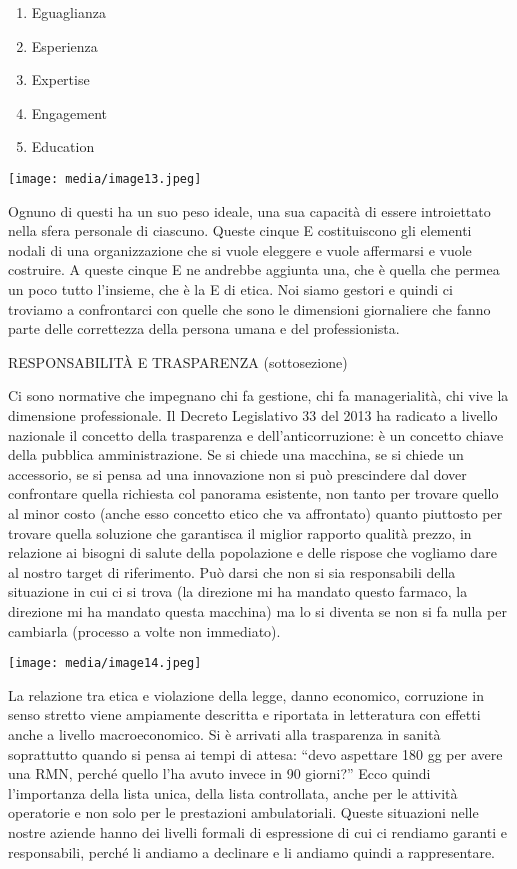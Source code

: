 \documentclass[]{article}
\begin{document}
\begin{enumerate}
\def\labelenumi{\arabic{enumi}.}
\item
  Eguaglianza
\item
  Esperienza
\item
  Expertise
\item
  Engagement
\item
  Education
\end{enumerate}

\texttt{[image: media/image13.jpeg]}

Ognuno di questi ha un suo peso ideale, una sua capacità di essere
introiettato nella sfera personale di ciascuno. Queste cinque E
costituiscono gli elementi nodali di una organizzazione che si vuole
eleggere e vuole affermarsi e vuole costruire. A queste cinque E ne
andrebbe aggiunta una, che è quella che permea un poco tutto l'insieme,
che è la E di etica. Noi siamo gestori e quindi ci troviamo a
confrontarci con quelle che sono le dimensioni giornaliere che fanno
parte delle correttezza della persona umana e del professionista.

RESPONSABILITÀ E TRASPARENZA (sottosezione)

Ci sono normative che impegnano chi fa gestione, chi fa managerialità,
chi vive la dimensione professionale. Il Decreto Legislativo 33 del 2013
ha radicato a livello nazionale il concetto della trasparenza e
dell'anticorruzione: è un concetto chiave della pubblica
amministrazione. Se si chiede una macchina, se si chiede un accessorio,
se si pensa ad una innovazione non si può prescindere dal dover
confrontare quella richiesta col panorama esistente, non tanto per
trovare quello al minor costo (anche esso concetto etico che va
affrontato) quanto piuttosto per trovare quella soluzione che garantisca
il miglior rapporto qualità prezzo, in relazione ai bisogni di salute
della popolazione e delle rispose che vogliamo dare al nostro target di
riferimento. Può darsi che non si sia responsabili della situazione in
cui ci si trova (la direzione mi ha mandato questo farmaco, la direzione
mi ha mandato questa macchina) ma lo si diventa se non si fa nulla per
cambiarla (processo a volte non immediato).

\texttt{[image: media/image14.jpeg]}

La relazione tra etica e violazione della legge, danno economico,
corruzione in senso stretto viene ampiamente descritta e riportata in
letteratura con effetti anche a livello macroeconomico. Si è arrivati
alla trasparenza in sanità soprattutto quando si pensa ai tempi di
attesa: ``devo aspettare 180 gg per avere una RMN, perché quello l'ha
avuto invece in 90 giorni?'' Ecco quindi l'importanza della lista unica,
della lista controllata, anche per le attività operatorie e non solo per
le prestazioni ambulatoriali. Queste situazioni nelle nostre aziende
hanno dei livelli formali di espressione di cui ci rendiamo garanti e
responsabili, perché li andiamo a declinare e li andiamo quindi a
rappresentare.
\end{document}
